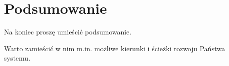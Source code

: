 \documentclass[12pt]{book}
\begin{document}












\chapter{Podsumowanie}

Na koniec proszę umieścić podsumowanie.

Warto zamieścić w nim m.in. możliwe kierunki
i ścieżki rozwoju Państwa systemu.
\end{document}

